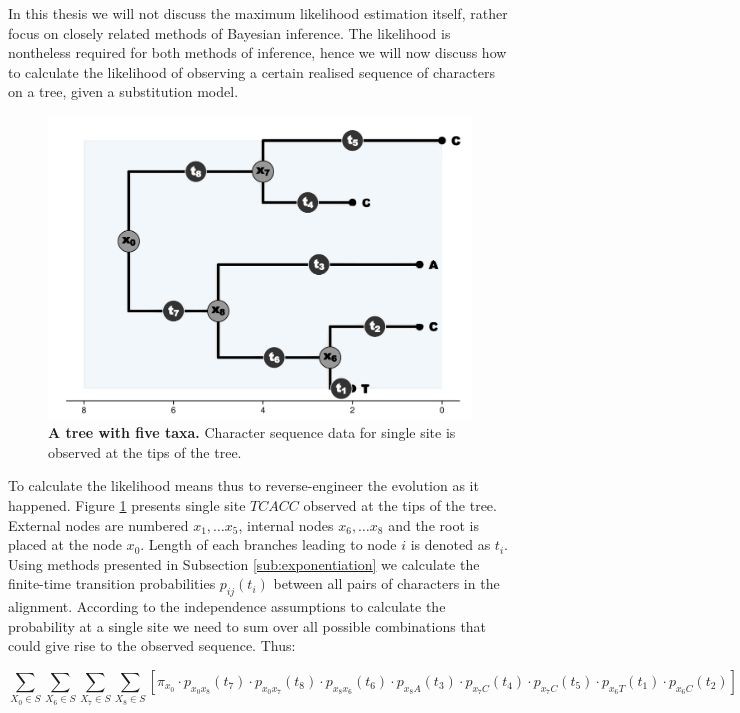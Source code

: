 \documentclass[12pt,twoside]{mitthesis}
\theoremstyle{plain}
\theoremstyle{definition}
\theoremstyle{remark}
\begin{document}
In this thesis we will not discuss the maximum likelihood estimation itself, rather focus on closely related methods of Bayesian inference.
The likelihood is nontheless required for both methods of inference, hence we will now discuss how to calculate the likelihood of observing a certain realised sequence of characters on a tree, given a substitution model.

\begin{figure}[h]
\begin{center}
\includegraphics[scale=0.5]{likelihood} 
\end{center}
\caption{{ \footnotesize {\bf  A tree with five taxa.} 
Character sequence data for single site is observed at the tips of the tree.
}}
\label{fig:LIKELIHOOD}
\end{figure}

To calculate the likelihood means thus to reverse-engineer the evolution as it happened.
Figure \ref{fig:LIKELIHOOD} presents single site $TCACC$ observed at the tips of the tree.
External nodes are numbered $x_{1}, \ldots x_{5}$, internal nodes $x_{6}, \ldots x_{8}$ and the root is placed at the node $x_{0}$.
Length of each branches leading to node $i$ is denoted as $t_{i}$.
Using methods presented in Subsection \ref{sub:exponentiation} we calculate the finite-time transition probabilities $p_{ij}(t_{i})$ between all pairs of characters in the alignment.
According to the independence assumptions to calculate the probability at a single site we need to sum over all possible combinations that could give rise to the observed sequence. Thus:

\begin{equation}
\underset{X_{0}\in S}{\sum}\underset{X_{6}\in S}{\sum}\underset{X_{7}\in S}{\sum}\underset{X_{8}\in S}{\sum}[\pi_{x_{0}}\cdot p_{x_{0}x_{8}}(t_{7})\cdot p_{x_{0}x_{7}}(t_{8})\cdot p_{x_{8}x_{6}}(t_{6})\cdot p_{x_{8}A}(t_{3})\cdot p_{x_{7}C}(t_{4})\cdot p_{x_{7}C}(t_{5})\cdot p_{x_{6}T}(t_{1})\cdot p_{x_{6}C}(t_{2})]
\label{eq:likelihoodNaive}
\end{equation}
\end{document}
